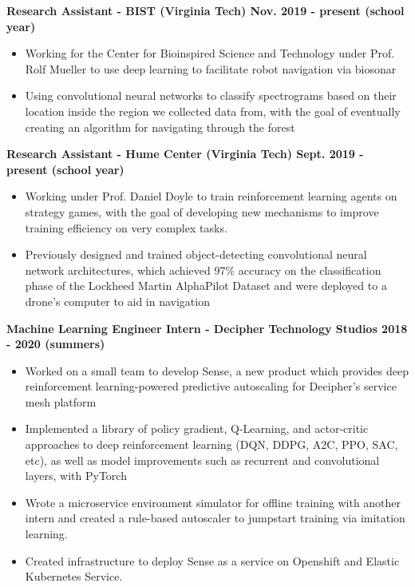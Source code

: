 \documentclass{article}
\begin{document}
\begin{center}
\begin{flushleft}
    \textbf{Research Assistant - BIST (Virginia Tech) \hfill Nov. 2019 - present (school year)}
    \begin{itemize}
      \itemsep0em
      \item Working for the Center for Bioinspired Science and Technology under Prof. Rolf Mueller to use deep learning to facilitate robot navigation via biosonar
      \item Using convolutional neural networks to classify spectrograms based on their location inside the region we collected data from, with the goal of eventually creating an algorithm for navigating through the forest 
    \end{itemize}

    \textbf{Research Assistant - Hume Center (Virginia Tech) \hfill Sept. 2019 - present (school year)}
    \begin{itemize}
      \itemsep0em
      \item Working under Prof. Daniel Doyle to train reinforcement learning agents on strategy games, with the goal of developing new mechanisms to improve training efficiency on very complex tasks. 
      \item Previously designed and trained object-detecting convolutional neural network architectures, which achieved 97\% accuracy on the classification phase of the Lockheed Martin AlphaPilot Dataset and were deployed to a drone's computer to aid in navigation
    \end{itemize}

    \textbf{Machine Learning Engineer Intern - Decipher Technology Studios \hfill 2018 - 2020 (summers)}
    \begin{itemize}
      \itemsep0em
      \item Worked on a small team to develop Sense, a new product which provides deep reinforcement learning-powered predictive autoscaling for Decipher’s service mesh platform
      \item Implemented a library of policy gradient, Q-Learning, and actor-critic approaches to deep reinforcement learning (DQN, DDPG, A2C, PPO, SAC, etc), as well as model improvements such as recurrent and convolutional layers, with PyTorch
      \item Wrote a microservice environment simulator for offline training with another intern and created a rule-based autoscaler to jumpstart training via imitation learning.
      \item Created infrastructure to deploy Sense as a service on Openshift and Elastic Kubernetes Service.
    \end{itemize}



\end{flushleft}
\end{center}
\end{document}
